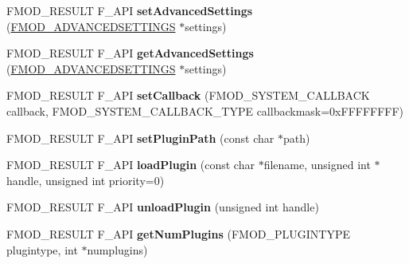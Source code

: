 \begin{DoxyCompactItemize}
\item 
\hypertarget{class_f_m_o_d_1_1_system_a8e7c0f550c5c540d8889fb835992cff5}{F\+M\+O\+D\+\_\+\+R\+E\+S\+U\+L\+T F\+\_\+\+A\+P\+I {\bfseries set\+Advanced\+Settings} (\hyperlink{struct_f_m_o_d___a_d_v_a_n_c_e_d_s_e_t_t_i_n_g_s}{F\+M\+O\+D\+\_\+\+A\+D\+V\+A\+N\+C\+E\+D\+S\+E\+T\+T\+I\+N\+G\+S} $\ast$settings)}\label{class_f_m_o_d_1_1_system_a8e7c0f550c5c540d8889fb835992cff5}

\item 
\hypertarget{class_f_m_o_d_1_1_system_a9c111315da6297cb6889aedfd46c3daa}{F\+M\+O\+D\+\_\+\+R\+E\+S\+U\+L\+T F\+\_\+\+A\+P\+I {\bfseries get\+Advanced\+Settings} (\hyperlink{struct_f_m_o_d___a_d_v_a_n_c_e_d_s_e_t_t_i_n_g_s}{F\+M\+O\+D\+\_\+\+A\+D\+V\+A\+N\+C\+E\+D\+S\+E\+T\+T\+I\+N\+G\+S} $\ast$settings)}\label{class_f_m_o_d_1_1_system_a9c111315da6297cb6889aedfd46c3daa}

\item 
\hypertarget{class_f_m_o_d_1_1_system_a70f579154de7d2ba3ca958d4c83707f1}{F\+M\+O\+D\+\_\+\+R\+E\+S\+U\+L\+T F\+\_\+\+A\+P\+I {\bfseries set\+Callback} (F\+M\+O\+D\+\_\+\+S\+Y\+S\+T\+E\+M\+\_\+\+C\+A\+L\+L\+B\+A\+C\+K callback, F\+M\+O\+D\+\_\+\+S\+Y\+S\+T\+E\+M\+\_\+\+C\+A\+L\+L\+B\+A\+C\+K\+\_\+\+T\+Y\+P\+E callbackmask=0x\+F\+F\+F\+F\+F\+F\+F\+F)}\label{class_f_m_o_d_1_1_system_a70f579154de7d2ba3ca958d4c83707f1}

\item 
\hypertarget{class_f_m_o_d_1_1_system_ae1a00669920caf97abb5228d2053a28a}{F\+M\+O\+D\+\_\+\+R\+E\+S\+U\+L\+T F\+\_\+\+A\+P\+I {\bfseries set\+Plugin\+Path} (const char $\ast$path)}\label{class_f_m_o_d_1_1_system_ae1a00669920caf97abb5228d2053a28a}

\item 
\hypertarget{class_f_m_o_d_1_1_system_a046e94ca835e30f60564dbf44cfa111f}{F\+M\+O\+D\+\_\+\+R\+E\+S\+U\+L\+T F\+\_\+\+A\+P\+I {\bfseries load\+Plugin} (const char $\ast$filename, unsigned int $\ast$handle, unsigned int priority=0)}\label{class_f_m_o_d_1_1_system_a046e94ca835e30f60564dbf44cfa111f}

\item 
\hypertarget{class_f_m_o_d_1_1_system_a07ae0f13eb4b291651f34c8fa59d76ff}{F\+M\+O\+D\+\_\+\+R\+E\+S\+U\+L\+T F\+\_\+\+A\+P\+I {\bfseries unload\+Plugin} (unsigned int handle)}\label{class_f_m_o_d_1_1_system_a07ae0f13eb4b291651f34c8fa59d76ff}

\item 
\hypertarget{class_f_m_o_d_1_1_system_a1a066a03febf0c76a43162e5abc09c7b}{F\+M\+O\+D\+\_\+\+R\+E\+S\+U\+L\+T F\+\_\+\+A\+P\+I {\bfseries get\+Num\+Plugins} (F\+M\+O\+D\+\_\+\+P\+L\+U\+G\+I\+N\+T\+Y\+P\+E plugintype, int $\ast$numplugins)}\label{class_f_m_o_d_1_1_system_a1a066a03febf0c76a43162e5abc09c7b}


\end{DoxyCompactItemize}

